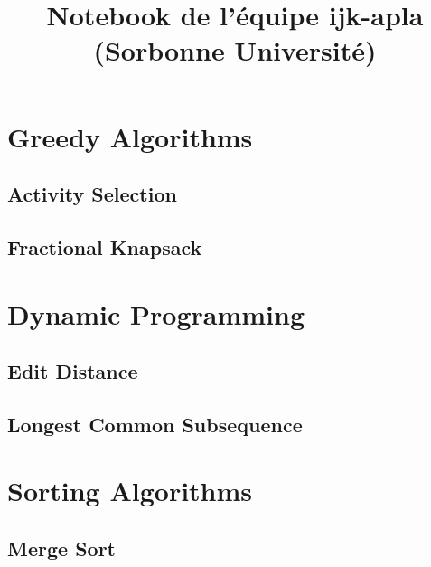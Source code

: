 \documentclass[10pt,a4paper]{article}
\title{\vspace{-4ex}\Large{Notebook de l'équipe \textbf{ijk-apla} (Sorbonne Université)}}
\author{}
\date{}
\begin{document}
\begin{landscape}
\begin{multicols}{2}

\maketitle
\tableofcontents

\section{Greedy Algorithms}

\subsection{Activity Selection}



\subsection{Fractional Knapsack}



\section{Dynamic Programming}

\subsection{Edit Distance}



\subsection{Longest Common Subsequence}



\section{Sorting Algorithms}

\subsection{Merge Sort}


\end{multicols}
\end{landscape}
\end{document}
